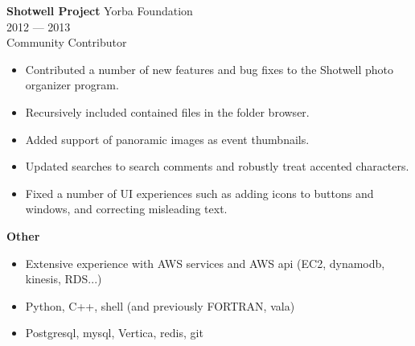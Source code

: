 \myfontsize{\bigheader}
\textbf{Shotwell Project}
\myfontsize{\bodysize}
Yorba Foundation\\
2012 --- 2013\\
Community Contributor\\
\begin{itemize}[topsep=1ex, partopsep=0ex, parsep=0ex, itemsep=0.5ex]
    \item Contributed a number of new features and bug fixes to the Shotwell photo organizer program.
    \item Recursively included contained files in the folder browser.
    \item Added support of panoramic images as event thumbnails.
    \item Updated searches to search comments and robustly treat accented characters.
    \item Fixed a number of UI experiences such as adding icons to buttons and windows, and correcting misleading text.
\end{itemize}


\vspace{\mybigskip}
\myfontsize{\littleheader}
\textbf{Other}\\
\myfontsize{\bodysize}
\begin{itemize}[topsep=1ex, partopsep=0ex, parsep=0ex, itemsep=0.5ex]
    \item Extensive experience with AWS services and AWS api (EC2, dynamodb, kinesis, RDS...)
    \item Python, C++, shell (and previously FORTRAN, vala)
    \item Postgresql, mysql, Vertica, redis, git
\end{itemize}


